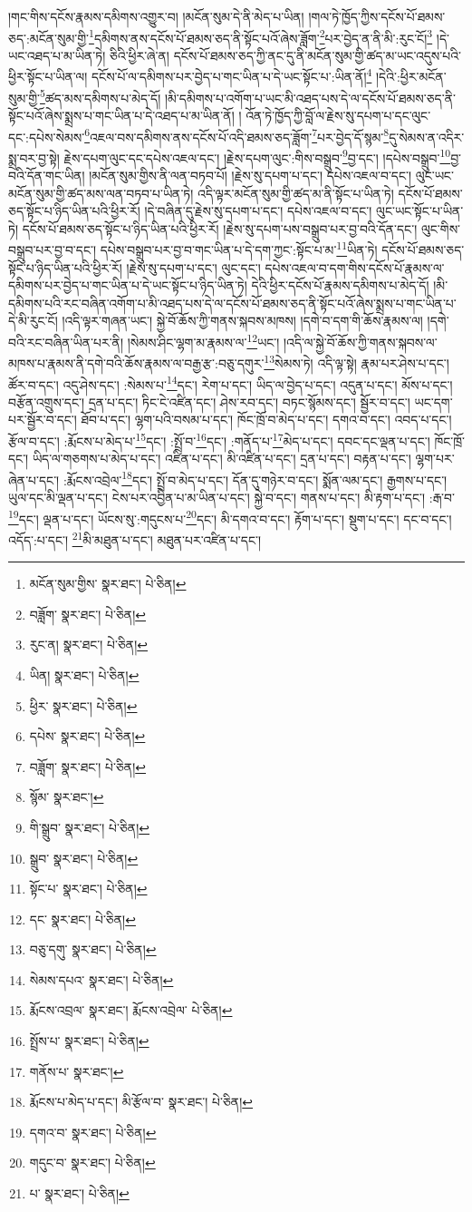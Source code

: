 །གང་གིས་དངོས་རྣམས་དམིགས་འགྱུར་བ། །མངོན་སུམ་དེ་ནི་མེད་པ་ཡིན། །གལ་ཏེ་ཁྱོད་ཀྱིས་དངོས་པོ་ཐམས་ཅད་:མངོན་སུམ་གྱི་\footnote{མངོན་སུམ་གྱིས་  སྣར་ཐང་།  པེ་ཅིན། }དམིགས་ནས་དངོས་པོ་ཐམས་ཅད་ནི་སྟོང་པའོ་ཞེས་ཟློག་\footnote{བཟློག་  སྣར་ཐང་།  པེ་ཅིན། }པར་བྱེད་ན་ནི་མི་:རུང་ངོ།\footnote{རུང་ན།  སྣར་ཐང་།  པེ་ཅིན། } །དེ་ཡང་འཐད་པ་མ་ཡིན་ཏེ། ཅིའི་ཕྱིར་ཞེ་ན། དངོས་པོ་ཐམས་ཅད་ཀྱི་ནང་དུ་ནི་མངོན་སུམ་གྱི་ཚད་མ་ཡང་འདུས་པའི་ཕྱིར་སྟོང་པ་ཡིན་ལ། དངོས་པོ་ལ་དམིགས་པར་བྱེད་པ་གང་ཡིན་པ་དེ་ཡང་སྟོང་པ་:ཡིན་ནོ།\footnote{ཡིན།  སྣར་ཐང་།  པེ་ཅིན། } །དེའི་:ཕྱིར་མངོན་སུམ་གྱི་\footnote{ཕྱིར་  སྣར་ཐང་།  པེ་ཅིན། }ཚད་མས་དམིགས་པ་མེད་དོ། །མི་དམིགས་པ་འགོག་པ་ཡང་མི་འཐད་པས་དེ་ལ་དངོས་པོ་ཐམས་ཅད་ནི་སྟོང་པའོ་ཞེས་སྨྲས་པ་གང་ཡིན་པ་དེ་འཐད་པ་མ་ཡིན་ནོ། །
འོན་ཏེ་ཁྱོད་ཀྱི་བློ་ལ་རྗེས་སུ་དཔག་པ་དང་ལུང་དང་:དཔེས་སེམས་\footnote{དཔེས་  སྣར་ཐང་།  པེ་ཅིན། }འཇལ་བས་དམིགས་ནས་དངོས་པོ་འདི་ཐམས་ཅད་ཟློག་\footnote{བཟློག་  སྣར་ཐང་།  པེ་ཅིན། }པར་བྱེད་དོ་སྙམ་\footnote{སྙོམ་  སྣར་ཐང་། }དུ་སེམས་ན་འདིར་སྨྲ་བར་བྱ་སྟེ། རྗེས་དཔག་ལུང་དང་དཔེས་འཇལ་དང་། །རྗེས་དཔག་ལུང་:གིས་བསྒྲུབ་\footnote{གི་སྒྲུབ་  སྣར་ཐང་།  པེ་ཅིན། }བྱ་དང་། །དཔེས་བསྒྲུབ་\footnote{སྒྲུབ་  སྣར་ཐང་།  པེ་ཅིན། }བྱ་བའི་དོན་གང་ཡིན། །མངོན་སུམ་གྱིས་ནི་ལན་བཏབ་པོ། །རྗེས་སུ་དཔག་པ་དང་། དཔེས་འཇལ་བ་དང་། ལུང་ཡང་མངོན་སུམ་གྱི་ཚད་མས་ལན་བཏབ་པ་ཡིན་ཏེ། འདི་ལྟར་མངོན་སུམ་གྱི་ཚད་མ་ནི་སྟོང་པ་ཡིན་ཏེ། དངོས་པོ་ཐམས་ཅད་སྟོང་པ་ཉིད་ཡིན་པའི་ཕྱིར་རོ། །དེ་བཞིན་དུ་རྗེས་སུ་དཔག་པ་དང་། དཔེས་འཇལ་བ་དང་། ལུང་ཡང་སྟོང་པ་ཡིན་ཏེ། དངོས་པོ་ཐམས་ཅད་སྟོང་པ་ཉིད་ཡིན་པའི་ཕྱིར་རོ། །རྗེས་སུ་དཔག་པས་བསྒྲུབ་པར་བྱ་བའི་དོན་དང་། ལུང་གིས་བསྒྲུབ་པར་བྱ་བ་དང་། དཔེས་བསྒྲུབ་པར་བྱ་བ་གང་ཡིན་པ་དེ་དག་ཀྱང་:སྟོང་པ་མ་\footnote{སྟོང་པ་  སྣར་ཐང་།  པེ་ཅིན། }ཡིན་ཏེ། དངོས་པོ་ཐམས་ཅད་སྟོང་པ་ཉིད་ཡིན་པའི་ཕྱིར་རོ། །རྗེས་སུ་དཔག་པ་དང་། ལུང་དང་། དཔེས་འཇལ་བ་དག་གིས་དངོས་པོ་རྣམས་ལ་དམིགས་པར་བྱེད་པ་གང་ཡིན་པ་དེ་ཡང་སྟོང་པ་ཉིད་ཡིན་ཏེ། དེའི་ཕྱིར་དངོས་པོ་རྣམས་དམིགས་པ་མེད་དོ། །མི་དམིགས་པའི་རང་བཞིན་འགོག་པ་མི་འཐད་པས་དེ་ལ་དངོས་པོ་ཐམས་ཅད་ནི་སྟོང་པའོ་ཞེས་སྨྲས་པ་གང་ཡིན་པ་དེ་མི་རུང་ངོ། །འདི་ལྟར་གཞན་ཡང་། སྐྱེ་བོ་ཆོས་ཀྱི་གནས་སྐབས་མཁས། །དགེ་བ་དག་གི་ཆོས་རྣམས་ལ། །དགེ་བའི་རང་བཞིན་ཡིན་པར་ནི། །སེམས་ཤིང་ལྷག་མ་རྣམས་ལ་\footnote{དང་  སྣར་ཐང་།  པེ་ཅིན། }ཡང་། །འདི་ལ་སྐྱེ་བོ་ཆོས་ཀྱི་གནས་སྐབས་ལ་མཁས་པ་རྣམས་ནི་དགེ་བའི་ཆོས་རྣམས་ལ་བརྒྱ་རྩ་:བཅུ་དགུར་\footnote{བཅུ་དགུ་  སྣར་ཐང་།  པེ་ཅིན། }སེམས་ཏེ། འདི་ལྟ་སྟེ། རྣམ་པར་ཤེས་པ་དང་། ཚོར་བ་དང་། འདུ་ཤེས་དང་། :སེམས་པ་\footnote{སེམས་དཔའ་  སྣར་ཐང་།  པེ་ཅིན། }དང་། རེག་པ་དང་། ཡིད་ལ་བྱེད་པ་དང་། འདུན་པ་དང་། མོས་པ་དང་། བརྩོན་འགྲུས་དང་། དྲན་པ་དང་། ཏིང་ངེ་འཛིན་དང་། ཤེས་རབ་དང་། བཏང་སྙོམས་དང་། སྦྱོར་བ་དང་། ཡང་དག་པར་སྦྱོར་བ་དང་། ཐོབ་པ་དང་། ལྷག་པའི་བསམ་པ་དང་། ཁོང་ཁྲོ་བ་མེད་པ་དང་། དགའ་བ་དང་། འབད་པ་དང་། རྩོལ་བ་དང་། :རྨོངས་པ་མེད་པ་\footnote{རྨོངས་འབྲལ་  སྣར་ཐང་། རྨོངས་འབྲེལ་  པེ་ཅིན། }དང་། :སྤྲོ་བ་\footnote{སྤྲོས་པ་  སྣར་ཐང་།  པེ་ཅིན། }དང་། :གནོད་པ་\footnote{གནོས་པ་  སྣར་ཐང་། }མེད་པ་དང་། དབང་དང་ལྡན་པ་དང་། ཁོང་ཁྲོ་དང་། ཡིད་ལ་གཅགས་པ་མེད་པ་དང་། འཛིན་པ་དང་། མི་འཛིན་པ་དང་། དྲན་པ་དང་། བརྟན་པ་དང་། ལྷག་པར་ཞེན་པ་དང་། :རྨོངས་འབྲེལ་\footnote{རྨོངས་པ་མེད་པ་དང་། མི་རྩོལ་བ་  སྣར་ཐང་།  པེ་ཅིན། }དང་། སྤྲོ་བ་མེད་པ་དང་། དོན་དུ་གཉེར་བ་དང་། སྨོན་ལམ་དང་། རྒྱགས་པ་དང་། ཡུལ་དང་མི་ལྡན་པ་དང་། ངེས་པར་འབྱིན་པ་མ་ཡིན་པ་དང་། སྐྱེ་བ་དང་། གནས་པ་དང་། མི་རྟག་པ་དང་། :རྒ་བ་\footnote{དགའ་བ་  སྣར་ཐང་།  པེ་ཅིན། }དང་། ལྡན་པ་དང་། ཡོངས་སུ་:གདུངས་པ་\footnote{གདུང་བ་  སྣར་ཐང་།  པེ་ཅིན། }དང་། མི་དགའ་བ་དང་། རྟོག་པ་དང་། སྡུག་པ་དང་། དང་བ་དང་། འདོད་:པ་དང་། \footnote{པ་  སྣར་ཐང་།  པེ་ཅིན། }མི་མཐུན་པ་དང་། མཐུན་པར་འཛིན་པ་དང་། 